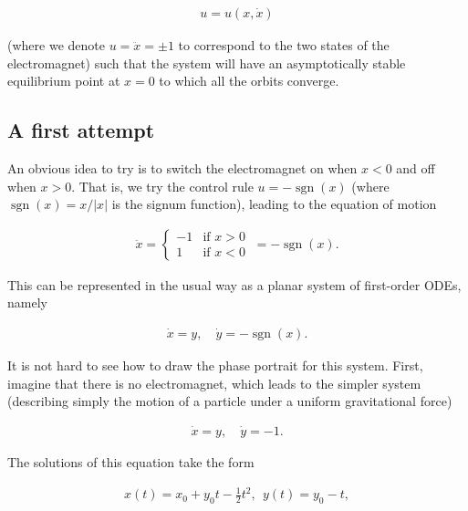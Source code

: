 \documentclass[11pt]{report}
\theoremstyle{plain}
\theoremstyle{definition}
\begin{document}
\begin{align*}
u = u(x, \dot{x})
\end{align*}

(where we denote $u=\ddot{x}=\pm 1$ to correspond to
the two states of the electromagnet) such that the
system will have an asymptotically stable equilibrium
point at $x=0$ to which all the orbits converge.

\subsection{A first attempt}
An obvious idea to try is to switch the electromagnet
on when $x<0$ and off when $x>0$. That is, we try the
control rule $u=-\operatorname{sgn}(x)$ (where
$\operatorname{sgn}(x)=x/|x|$ is the signum
function), leading to the equation of motion

\begin{equation*} \tag{43}\label{eq:magnet-unstable}
\begin{split}
\ddot{x} = \begin{cases} -1 & \textrm{if }x>0 \\ 1&\textrm{if }x<0\end{cases} \ = -\operatorname{sgn}(x).
\end{split}
\end{equation*}

This can be represented in the usual way as a planar
system of first-order ODEs, namely

\begin{align*}
\dot{x} = y, \quad \dot{y}= - \operatorname{sgn}(x).
\end{align*}

It is not hard to see how to draw the phase portrait
for this system. First, imagine that there is no
electromagnet, which leads to the simpler system
(describing simply the motion of a particle under a
uniform gravitational force)

\begin{equation*} \tag{44}\label{eq:gravity-system}
\begin{split}
\dot{x} = y, \quad \dot{y}= -1.
\end{split}
\end{equation*}

The solutions of this equation take the form

\begin{align*}
x(t) = x_0 + y_0t -\tfrac12 t^2, \ \ y(t)=y_0-t,
\end{align*}
\end{document}
